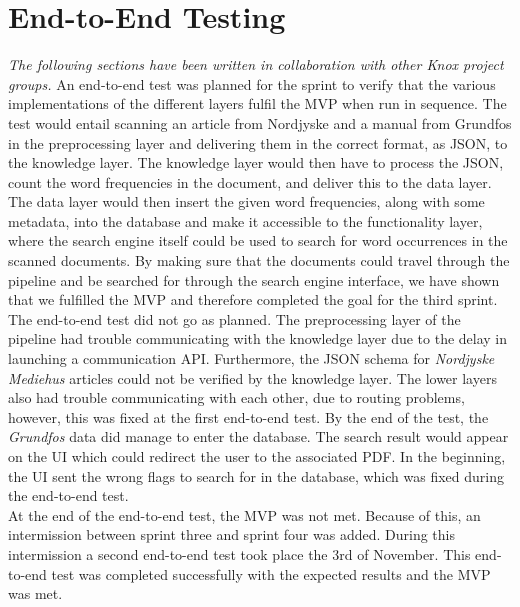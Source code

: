 \chapter{End-to-End Testing}\label{scrumofscrumendtotend}
\textit{The following sections have been written in collaboration with other Knox project groups.}
An end-to-end test was planned for the sprint to verify that the various implementations of the different layers fulfil the MVP when run in sequence. The test would entail scanning an article from Nordjyske and a manual from Grundfos in the preprocessing layer and delivering them in the correct format, as JSON, to the knowledge layer. The knowledge layer would then have to process the JSON, count the word frequencies in the document, and deliver this to the data layer. The data layer would then insert the given word frequencies, along with some metadata, into the database and make it accessible to the functionality layer, where the search engine itself could be used to search for word occurrences in the scanned documents.
By making sure that the documents could travel through the pipeline and be searched for through the search engine interface, we have shown that we fulfilled the MVP and therefore completed the goal for the third sprint.\\
The end-to-end test did not go as planned. The preprocessing layer of the pipeline had trouble communicating with the knowledge layer due to the delay in launching a communication API. Furthermore, the JSON schema for \textit{Nordjyske Mediehus} articles could not be verified by the knowledge layer.
The lower layers also had trouble communicating with each other, due to routing problems, however, this was fixed at the first end-to-end test. By the end of the test, the \textit{Grundfos} data did manage to enter the database. The search result would appear on the UI which could redirect the user to the associated PDF. In the beginning, the UI sent the wrong flags to search for in the database, which was fixed during the end-to-end test.\\
At the end of the end-to-end test, the MVP was not met. Because of this, an intermission between sprint three and sprint four was added. During this intermission a second end-to-end test took place the 3rd of November. This end-to-end test was completed successfully with the expected results and the MVP was met.